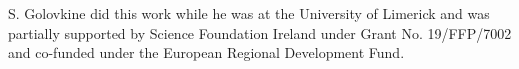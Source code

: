 \documentclass[USenglish]{article}
\theoremstyle{dgthm}
\theoremstyle{dgdef}
\begin{document}

\begin{funding}
	S. Golovkine did this work while he was at the University of Limerick and was partially supported by Science Foundation Ireland under Grant No. 19/FFP/7002 and co-funded under the European Regional Development Fund.
\end{funding}
%
%



\end{document}
